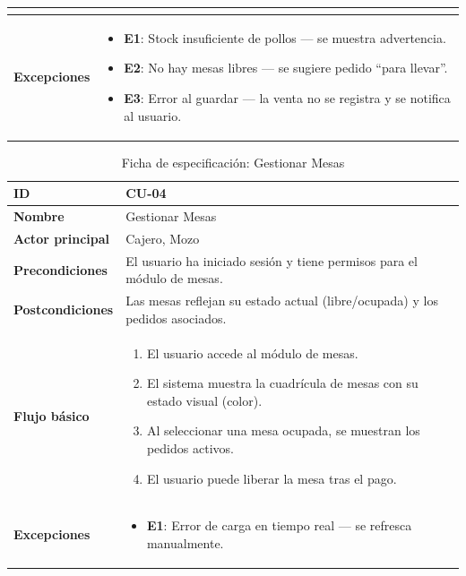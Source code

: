 \documentclass[12pt, a4paper]{article}
\begin{document}
\begin{table}[H]
\begin{tabularx}{\textwidth}{|l|X|}
\begin{itemize}[nosep, leftmargin=*]
    \end{itemize} \\ \hline
    \textbf{Excepciones} &
    \begin{itemize}[nosep, leftmargin=*]
        \item \textbf{E1}: Stock insuficiente de pollos --- se muestra advertencia.
        \item \textbf{E2}: No hay mesas libres --- se sugiere pedido ``para llevar''.
        \item \textbf{E3}: Error al guardar --- la venta no se registra y se notifica al usuario.
    \end{itemize} \\ \hline
\end{tabularx}
\end{table}

\begin{table}[H]
\centering
\caption{Ficha de especificación: Gestionar Mesas}
\begin{tabularx}{\textwidth}{|l|X|}
    \hline
    \textbf{ID} & CU-04 \\ \hline
    \textbf{Nombre} & Gestionar Mesas \\ \hline
    \textbf{Actor principal} & Cajero, Mozo \\ \hline
    \textbf{Precondiciones} & El usuario ha iniciado sesión y tiene permisos para el módulo de mesas. \\ \hline
    \textbf{Postcondiciones} & Las mesas reflejan su estado actual (libre/ocupada) y los pedidos asociados. \\ \hline
    \textbf{Flujo básico} &
    \begin{enumerate}[nosep, leftmargin=*]
        \item El usuario accede al módulo de mesas.
        \item El sistema muestra la cuadrícula de mesas con su estado visual (color).
        \item Al seleccionar una mesa ocupada, se muestran los pedidos activos.
        \item El usuario puede liberar la mesa tras el pago.
    \end{enumerate} \\ \hline
    \textbf{Excepciones} &
    \begin{itemize}[nosep, leftmargin=*]
        \item \textbf{E1}: Error de carga en tiempo real --- se refresca manualmente.
    \end{itemize} \\ \hline
\end{tabularx}
\end{table}
\end{document}
